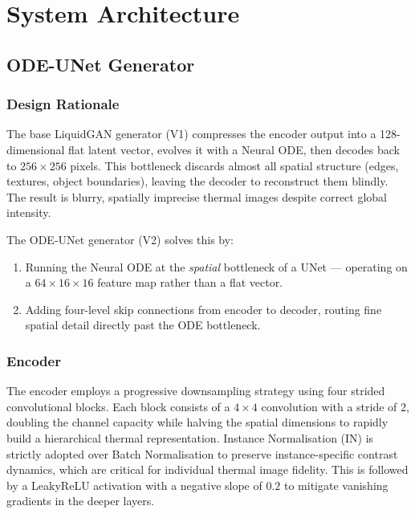\chapter{System Architecture}
\label{Chapter4}

\section{ODE-UNet Generator}

\subsection{Design Rationale}

The base LiquidGAN generator (V1) compresses the encoder output into a 128-dimensional flat latent vector, evolves it with a Neural ODE, then decodes back to $256 \times 256$ pixels. This bottleneck discards almost all spatial structure (edges, textures, object boundaries), leaving the decoder to reconstruct them blindly. The result is blurry, spatially imprecise thermal images despite correct global intensity.

The ODE-UNet generator (V2) solves this by:
\begin{enumerate}
    \item Running the Neural ODE at the \emph{spatial} bottleneck of a UNet — operating on a $64 \times 16 \times 16$ feature map rather than a flat vector.
    \item Adding four-level skip connections from encoder to decoder, routing fine spatial detail directly past the ODE bottleneck.
\end{enumerate}

\subsection{Encoder}

The encoder employs a progressive downsampling strategy using four strided convolutional blocks. Each block consists of a $4\times4$ convolution with a stride of 2, doubling the channel capacity while halving the spatial dimensions to rapidly build a hierarchical thermal representation. Instance Normalisation (IN) is strictly adopted over Batch Normalisation to preserve instance-specific contrast dynamics, which are critical for individual thermal image fidelity. This is followed by a LeakyReLU activation with a negative slope of $0.2$ to mitigate vanishing gradients in the deeper layers.

